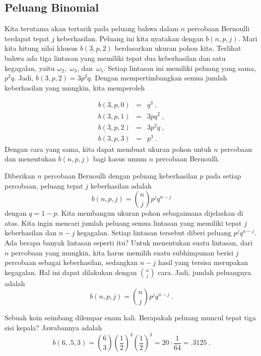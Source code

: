 \subsection*{Peluang Binomial}

Kita terutama akan tertarik pada peluang bahwa dalam $n$ percobaan Bernoulli terdapat
tepat $j$ keberhasilan.  Peluang ini kita nyatakan dengan $b(n,p,j)$.  Mari kita hitung
nilai khusus $b(3,p,2)$ berdasarkan ukuran pohon kita.  Terlihat bahwa ada tiga lintasan yang
memiliki tepat dua keberhasilan dan satu kegagalan, yaitu $\omega_2$,~$\omega_3$,
dan~$\omega_5$.  Setiap lintasan ini memiliki peluang yang sama, $p^2q$.  Jadi,
$b(3,p,2) = 3p^2q$.  Dengan mempertimbangkan semua jumlah keberhasilan yang mungkin,
kita memperoleh

\begin{eqnarray*} 
b(3,p,0) &=& q^3\ ,\\
b(3,p,1) &=& 3pq^2\ ,\\ 
b(3,p,2) &=& 3p^2q\ ,\\
b(3,p,3) &=& p^3\ .
\end{eqnarray*}
Dengan cara yang sama, kita dapat membuat ukuran pohon untuk $n$ percobaan dan
menentukan $b(n,p,j)$ bagi kasus umum $n$ percobaan Bernoulli.

\begin{theorem}\label{thm 3.8} Diberikan $n$ percobaan Bernoulli dengan peluang
keberhasilan $p$ pada setiap percobaan, peluang tepat $j$ keberhasilan adalah
$$ b(n,p,j) = {n \choose j} p^j q^{n - j}
$$ dengan $q = 1 - p$.
\proof Kita membangun ukuran pohon sebagaimana dijelaskan di atas.  Kita ingin mencari
jumlah peluang semua lintasan yang memiliki tepat $j$ keberhasilan dan $n - j$
kegagalan.  Setiap lintasan tersebut diberi peluang $p^j q^{n - j}$.  Ada berapa banyak
lintasan seperti itu?  Untuk menentukan suatu lintasan, dari $n$ percobaan yang mungkin,
kita harus memilih suatu subhimpunan berisi $j$ percobaan sebagai keberhasilan, sedangkan
$n-j$ hasil yang tersisa merupakan kegagalan.  Hal ini dapat dilakukan dengan
$n \choose j$ cara.   Jadi, jumlah peluangnya adalah
$$ b(n,p,j) = {n \choose j} p^j q^{n - j}\ .
$$
\end{theorem}

\begin{example}\label{exam 3.10} Sebuah koin seimbang dilempar enam kali.  Berapakah
peluang muncul tepat tiga sisi kepala?  Jawabannya adalah
$$ b(6,.5,3) = {6 \choose 3} \left(\frac12\right)^3 \left(\frac12\right)^3 = 20 \cdot
\frac1{64} = .3125\ .
$$
\end{example}

